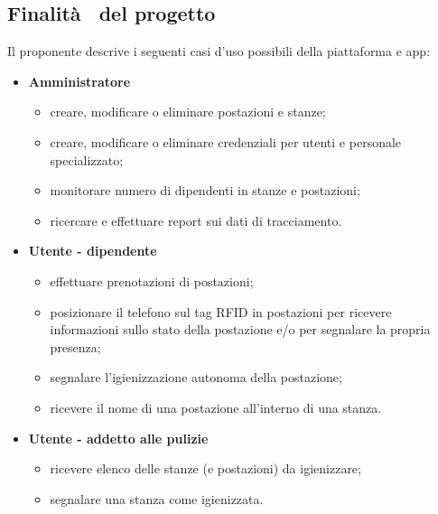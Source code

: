 \subsection{Finalità  del progetto}
Il proponente descrive i seguenti casi d'uso possibili della piattaforma e app:
\begin{itemize}
    \item \textbf{Amministratore}
    \begin{itemize}
        \item creare, modificare o eliminare postazioni e stanze;
        \item creare, modificare o eliminare credenziali per utenti e personale specializzato;
        \item monitorare numero di dipendenti in stanze e postazioni;
        \item ricercare e effettuare report sui dati di tracciamento.
    \end{itemize}
    \item \textbf{Utente - dipendente}
    \begin{itemize}
        \item effettuare prenotazioni di postazioni;
        \item posizionare il telefono sul tag RFID in postazioni per ricevere informazioni sullo stato della postazione e/o per segnalare la propria presenza;
        \item segnalare l'igienizzazione autonoma della postazione;
        \item ricevere il nome di una postazione all'interno di una stanza.
    \end{itemize}
    \item \textbf{Utente - addetto alle pulizie}
    \begin{itemize}
        \item ricevere elenco delle stanze (e postazioni) da igienizzare;
        \item segnalare una stanza come igienizzata.
    \end{itemize}
\end{itemize}
